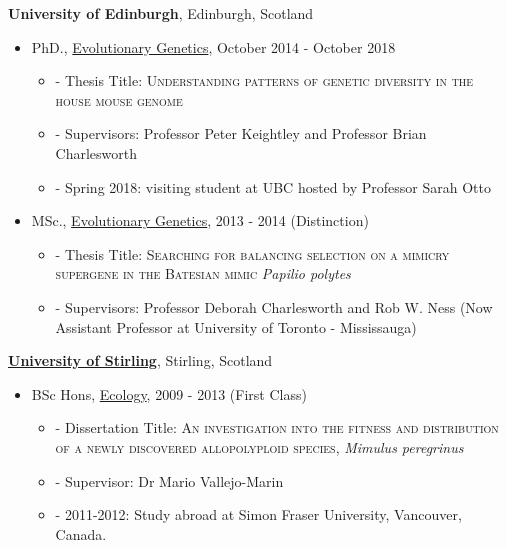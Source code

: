 \documentclass[11pt]{article}
\newenvironment{outerlist}[1][\enskip\textbullet]%
        {\begin{itemize}[#1,leftmargin=*]}{\end{itemize}%
         \vspace{-.6\baselineskip}}
\newenvironment{innerlist}[1][\enskip\textbullet]%
        {\begin{itemize}[#1,leftmargin=*,parsep=0pt,itemsep=0pt,topsep=0pt,partopsep=0pt]}
        {\end{itemize}}
\begin{document}
{\textbf{University of Edinburgh}},
Edinburgh, Scotland
\begin{outerlist}

\item[] PhD.,
             \href{http://www.ed.ac.uk/biology/evolutionary-biology} {Evolutionary Genetics},
             October 2014 - October 2018  
        \begin{innerlist}
        \item[]- Thesis Title: \textsc{Understanding patterns of genetic diversity in the house mouse genome}
        \item[]- Supervisors: Professor Peter Keightley and Professor Brian Charlesworth
        \item[]- Spring 2018: visiting student at UBC hosted by Professor Sarah Otto

        \end{innerlist}

\item[] MSc.,
        \href{http://qgen.bio.ed.ac.uk/}
             {Evolutionary Genetics},
             2013 - 2014 (Distinction)
        \begin{innerlist}
        \item[]- Thesis Title: \textsc{Searching for balancing selection on a mimicry supergene in the Batesian mimic} \textit{Papilio polytes}
        \item[]- Supervisors: Professor Deborah Charlesworth and Rob W. Ness (Now Assistant Professor at University of Toronto - Mississauga)

        \end{innerlist}
\end{outerlist}
\vspace{.1in}
\href{}{\textbf{University of Stirling}},
Stirling, Scotland
\begin{outerlist}
\item[] BSc Hons,
        \href{http://www.stir.ac.uk/natural-sciences/about-us/bes/}
             {Ecology}, 2009 - 2013 (First Class)
        \begin{innerlist}
        \item[]- Dissertation Title: \textsc{An investigation into the fitness and distribution of a newly discovered allopolyploid species,} \textit{Mimulus peregrinus}
        \item[]- Supervisor:
                   Dr Mario Vallejo-Marin
		\item[]- 2011-2012: Study abroad at Simon Fraser University, Vancouver, Canada.
        \end{innerlist}
\end{outerlist}
\end{document}
